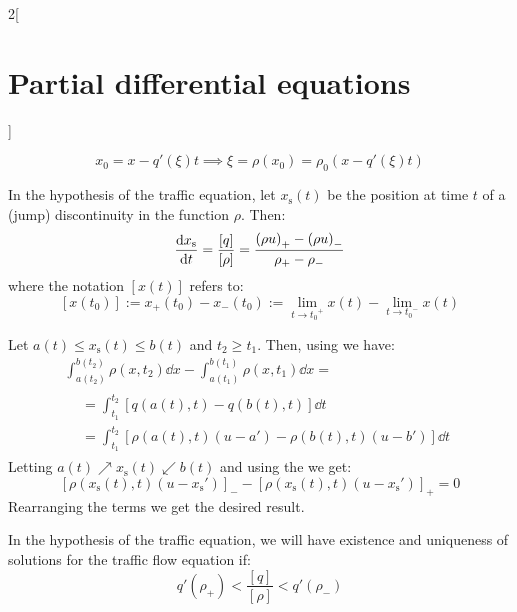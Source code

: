 \documentclass[../../../main_math.tex]{subfiles}
\begin{document}
\begin{multicols}{2}[\section{Partial differential equations}]
\begin{sproof}
    $$x_0=x-q'(\xi)t\implies \xi=\rho(x_0)=\rho_0(x-q'(\xi)t)$$
  \end{sproof}
  \begin{center}
    \begin{minipage}{\linewidth}
      \centering
      
      \label{PDE:traffic-char}
    \end{minipage}
  \end{center}
  \begin{proposition}
    In the hypothesis of the traffic equation, let $x_\mathrm{s}(t)$ be the position at time $t$ of a (jump) discontinuity in the function $\rho$. Then: $$\dv{x_\mathrm{s}}{t}=\frac{[q]}{[\rho]}=\frac{{(\rho u)}_+-{(\rho u)}_-}{\rho_+-\rho_-}$$ where the notation $[x(t)]$ refers to: $$[x(t_0)]:=x_+(t_0)-x_-(t_0):=\lim_{t\to{t_0}^+}x(t)-\lim_{t\to{t_0}^-}x(t)$$
  \end{proposition}
  \begin{sproof}
    Let $a(t)\leq x_\mathrm{s}(t)\leq b(t)$ and $t_2\geq t_1$. Then, using  we have:
    \begin{multline*}
      \int_{a(t_2)}^{b(t_2)}\rho(x,t_2)\dd{x}-\int_{a(t_1)}^{b(t_1)}\rho(x,t_1)\dd{x}=\\
      \begin{aligned}
         & =\int_{t_1}^{t_2}[q(a(t),t)-q(b(t),t)]\dd{t}                    \\
         & =\int_{t_1}^{t_2}[\rho(a(t),t)(u-a') -\rho(b(t),t)(u-b')]\dd{t}
      \end{aligned}
    \end{multline*}
    Letting $a(t)\nearrow x_\mathrm{s}(t)\swarrow b(t)$ and using the  we get: $$[\rho(x_\mathrm{s}(t),t)(u-{x_\mathrm{s}}')]_-- [\rho(x_\mathrm{s}(t),t)(u-{x_\mathrm{s}}')]_+=0$$
    Rearranging the terms we get the desired result.
  \end{sproof}
  \begin{lemma}
    In the hypothesis of the traffic equation, we will have existence and uniqueness of solutions for the traffic flow equation if: $$q'(\rho_+)<\frac{[q]}{[\rho]}< q'(\rho_-)$$
  \end{lemma}

\end{multicols}
\end{document}
